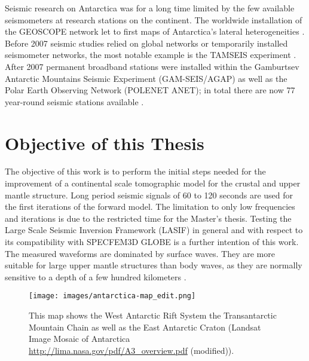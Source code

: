 Seismic research on Antarctica was for a long time limited by the few available seismometers at research stations on the continent. 
The worldwide installation of the GEOSCOPE network let to first maps of Antarctica's lateral heterogeneities \citep{Roult1994}.
Before 2007 seismic studies relied on global networks or temporarily installed seismometer networks, the most notable
example is the TAMSEIS experiment \citep{Lawrence2006}. 
After 2007 permanent broadband stations were installed within the Gamburtsev Antarctic Mountains Seismic Experiment (GAM-SEIS/AGAP)
as well as the Polar Earth Observing Network (POLENET ANET); 
in total there are now 77 year-round seismic stations available \citep{Anthony2014}.  


\section{Objective of this Thesis} %

The objective of this work is to perform the initial steps needed for the improvement of a continental scale tomographic model for the crustal and upper mantle structure.
Long period seismic signals of 60 to 120 seconds %
are used for the first iterations of the forward model. 
The limitation to only low frequencies and %
iterations is due to the restricted time for the Master's thesis.
Testing the Large Scale Seismic Inversion Framework (LASIF) in general and with respect to its compatibility with SPECFEM3D 
GLOBE is a further intention of this work.
The measured waveforms are dominated by surface waves. 
They are more suitable for large upper mantle structures than body waves, as they are normally sensitive to a depth of a few 
hundred kilometers \citep{Morelli2004}.

 


\begin{figure}[H]
\begin{center}
\texttt{[image: images/antarctica-map\_edit.png]}
\caption[Map of Antarctica \url{http://lima.nasa.gov/pdf/A3_overview.pdf}.]
{This map shows the West Antarctic Rift System the Transantarctic Mountain Chain as well as the East Antarctic Craton 
(Landsat Image Mosaic of Antarctica \url{http://lima.nasa.gov/pdf/A3_overview.pdf} (modified)).}
\label{ant-map}
\end{center}
\end{figure}





